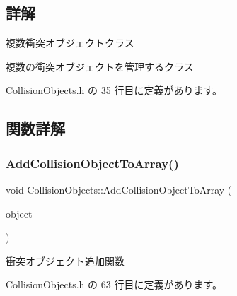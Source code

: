 \subsection{詳解}
複数衝突オブジェクトクラス 

複数の衝突オブジェクトを管理するクラス 

 Collision\+Objects.\+h の 35 行目に定義があります。



\subsection{関数詳解}
\mbox{\label{class_collision_objects_a50d6593f98cd04e23ad7ea9102eccc3c}} 
\subsubsection{\texorpdfstring{Add\+Collision\+Object\+To\+Array()}{AddCollisionObjectToArray()}}
{\footnotesize\ttfamily void Collision\+Objects\+::\+Add\+Collision\+Object\+To\+Array (\begin{DoxyParamCaption}\item[{\mbox{\hyperlink{class_collision_object}{Collision\+Object}} $\ast$}]{object }\end{DoxyParamCaption})\hspace{0.3cm}{\ttfamily [inline]}}



衝突オブジェクト追加関数 



 Collision\+Objects.\+h の 63 行目に定義があります。

